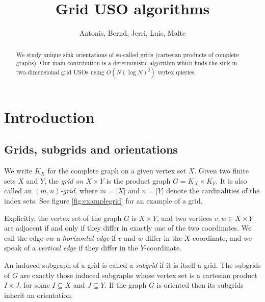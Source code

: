 \documentclass[a4paper,10pt]{article}
\title{Grid USO algorithms}
\author{Antonis, Bernd, Jerri, Luis, Malte}
\begin{document}
\maketitle 

\begin{abstract}
    \noindent
    We study unique sink orientations of so-called grids
    (cartesian products of complete graphs).
    Our main contribution is a deterministic algorithm which finds the sink in
    two-dimensional grid USOs using $O(N (\log N)^2)$ vertex queries.
\end{abstract}

\section{Introduction}

\subsection{Grids, subgrids and orientations}

We write $K_X$ for the complete graph on a given vertex set $X$.
Given two finite sets $X$ and $Y$,
the \emph{grid on $X \times Y$} is the product graph $G = K_X \times K_Y$.
It is also called an \emph{$(m,n)$-grid}, where $m = |X|$ and $n = |Y|$ denote
the cardinalities of the index sets.
See figure \ref{fig:examplegrid} for an example of a grid.

Explicitly, the vertex set of the graph $G$ is $X \times Y$, and two
vertices $v,w \in X \times Y$ are adjacent if and only if they differ in
exactly one of the two coordinates.
We call the edge $vw$ a \emph{horizontal edge} if $v$ and $w$ differ in the
$X$-coordinate, and we speak of a \emph{vertical edge} if they differ in the
$Y$-coordinate.

An induced subgraph of a grid is called a \emph{subgrid} if it is itself a grid.
The subgrids of $G$ are exactly those induced subgraphs whose vertex set is a
cartesian product $I \times J$, for some $I \subseteq X$ and $J \subseteq Y$.
If the graph $G$ is oriented then its subgrids inherit an orientation.
\end{document}
